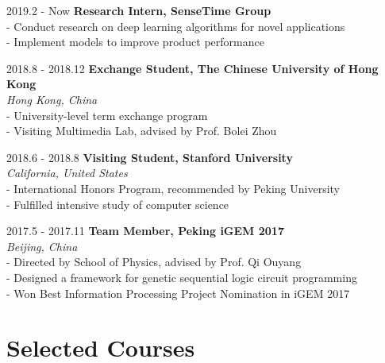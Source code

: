 \documentclass{academiccv}
\begin{document}
\begin{tablist}

\item[2019.2 - Now] 	\tab \textbf {Research Intern, SenseTime Group} \textbf
				    \\ \tab - Conduct research on deep learning algorithms for novel applications
				     \\ \tab - Implement models to improve product performance
				     
\item[2018.8 - 2018.12] 	\tab \textbf {Exchange Student, The Chinese University of Hong Kong} \textbf
					\\ \tab \emph{Hong Kong, China}\emph
					\\ \tab - University-level term exchange program
				      \\ \tab - Visiting Multimedia Lab, advised by Prof. Bolei Zhou
				   

\item[2018.6 - 2018.8] 	\tab \textbf {Visiting Student, Stanford University} \textbf
					\\ \tab \emph{California, United States}\emph
				      \\ \tab - International Honors Program, recommended by Peking University
				     \\ \tab - Fulfilled intensive study of computer science
				     
\item[2017.5 - 2017.11] 	\tab \textbf {Team Member, Peking iGEM 2017} \textbf
					\\ \tab \emph{Beijing, China}\emph
					\\ \tab - Directed by School of Physics, advised by Prof. Qi Ouyang
				      \\ \tab - Designed a framework for genetic sequential logic circuit programming
				     \\ \tab - Won Best Information Processing Project Nomination in iGEM 2017		   
				     				   
				   		      
\end{tablist}

\newpage

\section*{Selected Courses}
\end{document}
